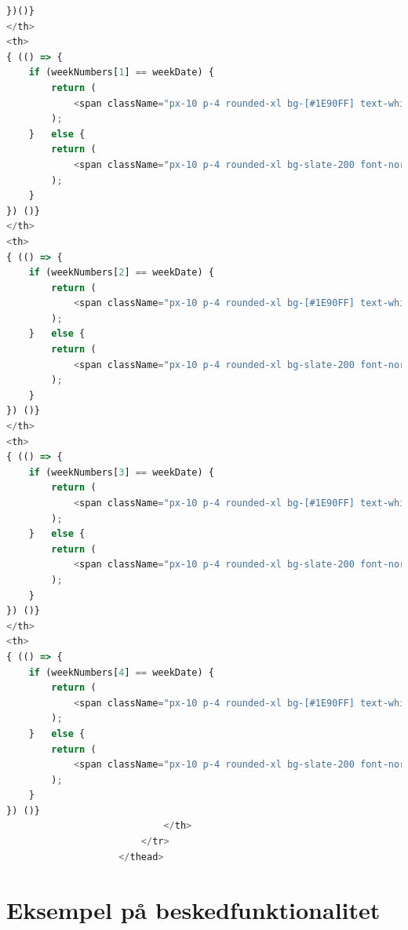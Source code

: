 \documentclass[12pt, a4paper]{article}
\begin{document}
\begin{appendices}
\begin{lstlisting}[language=Javascript]
    })()}
</th>
<th> 
{ (() => {
    if (weekNumbers[1] == weekDate) {
        return (
            <span className="px-10 p-4 rounded-xl bg-[#1E90FF] text-white font-normal">Tirsdag <strong>{ weekNumbers[1] }</strong></span> 
        );
    }   else {
        return (
            <span className="px-10 p-4 rounded-xl bg-slate-200 font-normal">Tirsdag <strong>{ weekNumbers[1] }</strong></span> 
        );
    }
}) ()}
</th>
<th> 
{ (() => {
    if (weekNumbers[2] == weekDate) {
        return (
            <span className="px-10 p-4 rounded-xl bg-[#1E90FF] text-white font-normal">Onsdag <strong>{ weekNumbers[2] }</strong></span> 
        );
    }   else {
        return (
            <span className="px-10 p-4 rounded-xl bg-slate-200 font-normal">Onsdag <strong>{ weekNumbers[2] }</strong></span> 
        );
    }
}) ()}
</th>
<th> 
{ (() => {
    if (weekNumbers[3] == weekDate) {
        return (
            <span className="px-10 p-4 rounded-xl bg-[#1E90FF] text-white font-normal">Torsdag <strong>{ weekNumbers[3] }</strong></span> 
        );
    }   else {
        return (
            <span className="px-10 p-4 rounded-xl bg-slate-200 font-normal">Torsdag <strong>{ weekNumbers[3] }</strong></span> 
        );
    }
}) ()}
</th>
<th> 
{ (() => {
    if (weekNumbers[4] == weekDate) {
        return (
            <span className="px-10 p-4 rounded-xl bg-[#1E90FF] text-white font-normal">Fredag <strong>{ weekNumbers[4] }</strong></span> 
        );
    }   else {
        return (
            <span className="px-10 p-4 rounded-xl bg-slate-200 font-normal">Fredag <strong>{ weekNumbers[4] }</strong></span> 
        );
    }
}) ()}
                            </th>
                        </tr>
                    </thead>
        \end{lstlisting} \newpage

        \section{Eksempel på beskedfunktionalitet} \newpage
        \renewcommand*{\thepage}{G\arabic{page}}
        \begin{landscape}
        \begin{figure}[H]
        \centering
        \end{figure}
        \end{landscape}
    
    \end{appendices}
\end{document}
